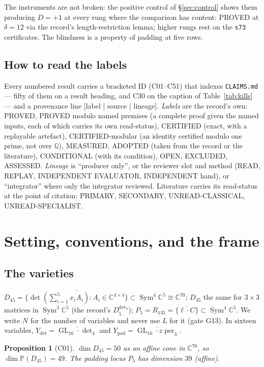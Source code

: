 \documentclass[11pt]{amsart}
\theoremstyle{plain}
\newtheorem{proposition}[theorem]{Proposition}
\theoremstyle{definition}
\theoremstyle{remark}
\DeclareMathOperator{\GL}{GL}
\DeclareMathOperator{\Sym}{Sym}
\DeclareMathOperator{\per}{per}
\newcommand{\bC}{\mathbb{C}}
\newcommand{\bP}{\mathbb{P}}
\newcommand{\bQ}{\mathbb{Q}}
\newcommand{\Dff}{D_{45}}
\newcommand{\Pf}{P_{5}}
\newcommand{\Ydet}{Y_{\det}}
\newcommand{\Ypad}{Y_{\mathrm{pad}}}
\newcommand{\prov}[3]{\par\smallskip\noindent{\footnotesize\textsf{[\,label: #1\ \textbar\ source: #2\ \textbar\ lineage: #3\,]}}\par\smallskip}
\newcommand{\cid}[1]{\textsf{#1}}
\newcommand{\cm}[1]{\texttt{#1}}
\begin{document}
The instruments are not broken: the positive control of \S\ref{sec:control} shows them producing
$D=+1$ at every rung where the comparison has content: PROVED at $\delta=12$ via the record's
length-restriction lemma; higher rungs rest on the \texttt{s73} certificates. The blindness is a property
of padding at five rows.

\subsection{How to read the labels}
Every numbered result carries a bracketed ID (\cid{C01}--\cid{C51}) that indexes
\texttt{CLAIMS.md} --- fifty of them on a result heading, and \cid{C30} on the caption of
Table~\ref{tab:kills} --- and a provenance line
\textsf{[label | source | lineage]}. \emph{Labels} are the record's own: PROVED, PROVED modulo
named premises (a complete proof given the named inputs, each of which carries its own
read-status), CERTIFIED
(exact, with a replayable artefact), CERTIFIED-modular (an identity certified modulo one prime,
not over $\bQ$), MEASURED, ADOPTED (taken from the record or the literature), CONDITIONAL (with
its condition), OPEN, EXCLUDED, ASSESSED. \emph{Lineage} is ``producer only'', or the reviewer
slot and method (READ, REPLAY, INDEPENDENT EVALUATOR, INDEPENDENT hand), or ``integrator'' where
only the integrator reviewed. Literature carries its read-status at the point of citation:
PRIMARY, SECONDARY, UNREAD-CLASSICAL, UNREAD-SPECIALIST.

\section{Setting, conventions, and the frame}\label{sec:setting}

\subsection{The varieties}
$\Dff=\overline{\{\det(\sum_{i=1}^5 x_iA_i): A_i\in\bC^{4\times4}\}}\subset\Sym^4\bC^5\cong\bC^{70}$;
$D_{35}$ the same for $3\times3$ matrices in $\Sym^3\bC^5$ (the record's $D_5^{\det_3}$);
$\Pf=R_{135}=\overline{\{\ell\cdot C\}}\subset\Sym^4\bC^5$. We write $N$ for the number of
variables and never use $L$ for it (gate G13). In sixteen variables,
$\Ydet=\overline{\GL_{16}\cdot\det_4}$ and $\Ypad=\overline{\GL_{16}\cdot z\per_3}$.

\begin{proposition}[\cid{C01}]\label{prop:dim}
$\dim\Dff=50$ as an affine cone in $\bC^{70}$, so $\dim\bP(\Dff)=49$. The padding locus $\Pf$ has
dimension $39$ (affine).
\end{proposition}
\prov{PROVED (certificate CERTIFIED); $\dim\Pf=39$ as recorded}{B18-01 Prop.~3.2 @ \cm{ea045cef}; B19-12 ledger F1 @ \cm{f008ac39}; B22-10 pilot~2 sanity row @ \cm{2efb7aaf}}{two lineages: B18 slot~10 (replay at two points) and integrator (own reimplementation)}
\end{document}
